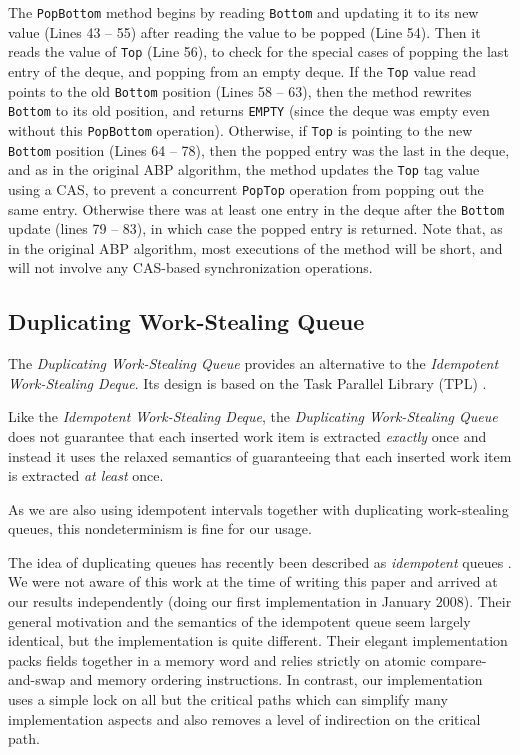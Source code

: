 The \lstinline!PopBottom! method begins by reading \lstinline!Bottom!
and updating it to its new value (Lines 43 -- 55) after reading the value
to be popped (Line 54). Then it reads the value of \lstinline!Top!
(Line 56), to check for the special cases of popping the last entry of
the deque, and popping from an empty deque. If the \lstinline!Top!
value read points to the old \lstinline!Bottom! position (Lines 58 -- 
63), then the method rewrites \lstinline!Bottom! to its old position,
and returns \lstinline!EMPTY! (since the deque was empty even without
this \lstinline!PopBottom! operation). Otherwise, if \lstinline!Top!
is pointing to the new \lstinline!Bottom! position (Lines 64 -- 78), then
the popped entry was the last in the deque, and as in the original ABP
algorithm, the method updates the \lstinline!Top! tag value using a
CAS, to prevent a concurrent \lstinline!PopTop! operation from
popping out the same entry. Otherwise there was at least one entry in
the deque after the \lstinline!Bottom! update (lines 79 -- 83), in which
case the popped entry is returned. Note that, as in the original ABP
algorithm, most executions of the method will be short, and will not
involve any CAS-based synchronization operations.


\subsection{Duplicating Work-Stealing Queue}
\label{sec:queues-alternative-implementations-duplicating-queue}

The \emph{Duplicating Work-Stealing Queue} provides an alternative to
the \emph{Idempotent Work-Stealing Deque}. Its design is based on the
Task Parallel Library (TPL) \cite{Leijen2009}.

Like the \emph{Idempotent Work-Stealing Deque}, the \emph{Duplicating
  Work-Stealing Queue} does not guarantee that each inserted work item
is extracted \emph{exactly} once and instead it uses the relaxed
semantics of guaranteeing that each inserted work item is extracted
\emph{at least} once.

As we are also using idempotent intervals together with duplicating
work-stealing queues, this nondeterminism is fine for our usage.

The idea of duplicating queues has recently been described as
\emph{idempotent} queues \cite{Michael2009}. We were not aware of this
work at the time of writing this paper and arrived at our results
independently (doing our first implementation in January 2008). Their
general motivation and the semantics of the idempotent queue seem
largely identical, but the implementation is quite different. Their
elegant implementation packs fields together in a memory word and
relies strictly on atomic compare-and-swap and memory ordering
instructions. In contrast, our implementation uses a simple lock on
all but the critical paths which can simplify many implementation
aspects and also removes a level of indirection on the critical path.

